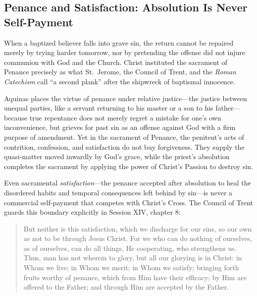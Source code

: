 \subsection{Penance and Satisfaction: Absolution Is Never Self-Payment}

When a baptized believer falls into grave sin, the return cannot be repaired merely by trying harder tomorrow, nor by pretending the offense did not injure communion with God and the Church. Christ instituted the sacrament of Penance precisely as what St.\ Jerome, the Council of Trent, and the \emph{Roman Catechism} call ``a second plank'' after the shipwreck of baptismal innocence.

Aquinas places the virtue of penance under relative justice---the justice between unequal parties, like a servant returning to his master or a son to his father---because true repentance does not merely regret a mistake for one's own inconvenience, but grieves for past sin as an offense against God with a firm purpose of amendment. Yet in the sacrament of Penance, the penitent's acts of contrition, confession, and satisfaction do not buy forgiveness. They supply the quasi-matter moved inwardly by God's grace, while the priest's absolution completes the sacrament by applying the power of Christ's Passion to destroy sin.

Even sacramental \emph{satisfaction}---the penance accepted after absolution to heal the disordered habits and temporal consequences left behind by sin---is never a commercial self-payment that competes with Christ's Cross. The Council of Trent guards this boundary explicitly in Session XIV, chapter 8:

\begin{quote}
But neither is this satisfaction, which we discharge for our sins, so our own as not to be through Jesus Christ. For we who can do nothing of ourselves, as of ourselves, can do all things, He cooperating, who strengthens us. Thus, man has not wherein to glory, but all our glorying is in Christ: in Whom we live; in Whom we merit; in Whom we satisfy; bringing forth fruits worthy of penance, which from Him have their efficacy; by Him are offered to the Father; and through Him are accepted by the Father.
\end{quote}

